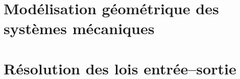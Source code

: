 \documentclass[10pt,fleqn]{article} %
\begin{document}

\vspace{2cm}
\pagestyle{fancy}
\thispagestyle{plain}

\section{Modélisation géométrique des systèmes mécaniques}

\section{Résolution des lois entrée--sortie}
\end{document}
